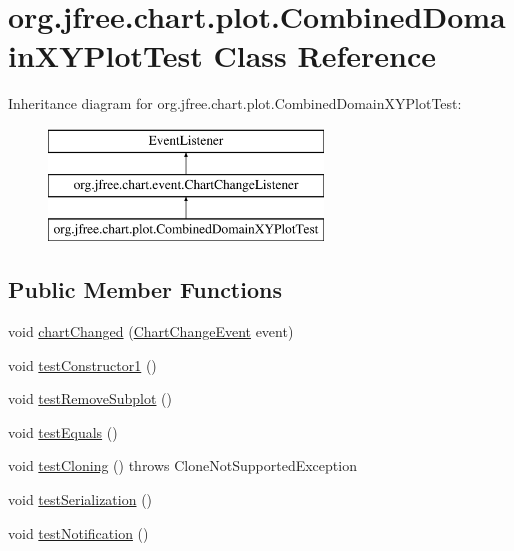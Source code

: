 \hypertarget{classorg_1_1jfree_1_1chart_1_1plot_1_1_combined_domain_x_y_plot_test}{}\section{org.\+jfree.\+chart.\+plot.\+Combined\+Domain\+X\+Y\+Plot\+Test Class Reference}
\label{classorg_1_1jfree_1_1chart_1_1plot_1_1_combined_domain_x_y_plot_test}
Inheritance diagram for org.\+jfree.\+chart.\+plot.\+Combined\+Domain\+X\+Y\+Plot\+Test\+:\begin{figure}[H]
\begin{center}
\leavevmode
\includegraphics[height=3.000000cm]{classorg_1_1jfree_1_1chart_1_1plot_1_1_combined_domain_x_y_plot_test}
\end{center}
\end{figure}
\subsection*{Public Member Functions}
\begin{DoxyCompactItemize}
\item 
void \mbox{\hyperlink{classorg_1_1jfree_1_1chart_1_1plot_1_1_combined_domain_x_y_plot_test_a4764082ee6dcd2f113379062abafafa3}{chart\+Changed}} (\mbox{\hyperlink{classorg_1_1jfree_1_1chart_1_1event_1_1_chart_change_event}{Chart\+Change\+Event}} event)
\item 
void \mbox{\hyperlink{classorg_1_1jfree_1_1chart_1_1plot_1_1_combined_domain_x_y_plot_test_a8332eb5a336b2e73b1c0ccac944d39d8}{test\+Constructor1}} ()
\item 
void \mbox{\hyperlink{classorg_1_1jfree_1_1chart_1_1plot_1_1_combined_domain_x_y_plot_test_a428a55122ec92d236d001f7e15bfdf6e}{test\+Remove\+Subplot}} ()
\item 
void \mbox{\hyperlink{classorg_1_1jfree_1_1chart_1_1plot_1_1_combined_domain_x_y_plot_test_a72fce06cf174436780208b7456cc58c9}{test\+Equals}} ()
\item 
void \mbox{\hyperlink{classorg_1_1jfree_1_1chart_1_1plot_1_1_combined_domain_x_y_plot_test_a6742cad7ee3e2e3e470b0a5b7585fec3}{test\+Cloning}} ()  throws Clone\+Not\+Supported\+Exception 
\item 
void \mbox{\hyperlink{classorg_1_1jfree_1_1chart_1_1plot_1_1_combined_domain_x_y_plot_test_a76e7dee65d252af01667e9623ceaadff}{test\+Serialization}} ()
\item 
void \mbox{\hyperlink{classorg_1_1jfree_1_1chart_1_1plot_1_1_combined_domain_x_y_plot_test_ab6ce5e01d92f2101a535ee8b7297aeb6}{test\+Notification}} ()
\end{DoxyCompactItemize}


